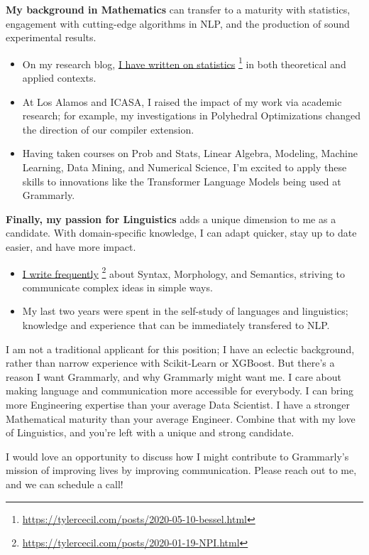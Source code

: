 \documentclass[sans, a4paper]{article}
\newcommand{\cvcolor}[1]{{\color{MidnightBlue}#1}}
\renewcommand{\hl}[1]{\cvcolor{\textbf{#1}}}
\renewcommand{\cite}[2]{\href{#2}{\ul{#1}} \footnote{\href{#2}{#2}}}
\begin{document}
\begin{adjustwidth}{40pt}{40pt}
  \hl{My background in Mathematics} can transfer to a maturity with statistics,
  engagement with cutting-edge algorithms in NLP, and the production of sound
  experimental results.
  \begin{itemize}
    \item On my research blog, \cite{I have written on statistics}
      {https://tylercecil.com/posts/2020-05-10-bessel.html}
      in both theoretical and applied contexts.
    \item At Los Alamos and ICASA, I raised the impact of my work via academic
      research; for example, my investigations in Polyhedral Optimizations
      changed the direction of our compiler extension.
    \item Having taken courses on Prob and Stats, Linear Algebra, Modeling,
      Machine Learning, Data Mining, and Numerical Science, I'm excited to
      apply these skills to innovations like the Transformer Language Models
      being used at Grammarly.
  \end{itemize} \medskip

  \hl{Finally, my passion for Linguistics} adds a unique dimension to me as a
  candidate. With domain-specific knowledge, I can adapt quicker, stay up to
  date easier, and have more impact.
  \begin{itemize}
    \item \cite{I write
      frequently}{https://tylercecil.com/posts/2020-01-19-NPI.html} about Syntax,
      Morphology, and Semantics, striving to communicate complex ideas in
      simple ways.
    \item My last two years were spent in the self-study of languages and
      linguistics; knowledge and experience that can be immediately transfered
      to NLP.
  \end{itemize}\medskip

  I am not a traditional applicant for this position; I have an eclectic
  background, rather than narrow experience with Scikit-Learn or XGBoost.  But
  there's a reason I want Grammarly, and why Grammarly might want me. I care
  about making language and communication more accessible for everybody. I can
  bring more Engineering expertise than your average Data Scientist. I have a
  stronger Mathematical maturity than your average Engineer. Combine that with
  my love of Linguistics, and you're left with a unique and strong candidate.
  \medskip

  I would love an opportunity to discuss how I might contribute to Grammarly's
  mission of improving lives by improving communication. Please reach out to
  me, and we can schedule a call!  \bigskip


\end{adjustwidth}
\end{document}
